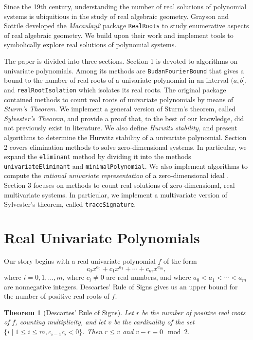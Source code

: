 \documentclass[12pt]{amsart}
\newtheorem{theorem}{Theorem}
\theoremstyle{definition}
\begin{document}
Since the 19th century, understanding the number of real solutions of polynomial systems is ubiquitious in the study of real algebraic geometry. Grayson and Sottile \cite{MR1949550} developed the \textit{Macaulay2} package \texttt{RealRoots} to study enumerative aspects of real algebraic geometry. We build upon their work and implement tools to symbolically explore real solutions of polynomial systems.

The paper is divided into three sections. Section 1 is devoted to algorithms on  univariate polynomials. Among its methods are \texttt{BudanFourierBound} that gives a bound to the number of real roots of a univariate polynomial in an interval $(a,b]$, and \texttt{realRootIsolation} which isolates its real roots. The original package contained methods to count real roots of univariate polynomials by means of \textit{Sturm's Theorem}. We implement a general version of Sturm's theorem, called \textit{Sylvester's Theorem}, and provide a proof that, to the best of our knowledge, did not previously exist in literature. We also define \textit{Hurwitz stability}, and present algorithms to determine the Hurwitz stability of a univariate polynomial. Section 2 covers elimination methods to solve zero-dimensional systems. In particular, we expand the \texttt{eliminant} method by dividing it into the methods \texttt{univariateEliminant} and \texttt{minimalPolynomial}. We also implement algorithms to compute the \textit{rational univariate representation} of a zero-dimensional ideal \cite{cite-key}. Section 3 focuses on methods to count real solutions of zero-dimensional, real multivariate systems. In particular, we implement a multivariate version of Sylvester's theorem, called \texttt{traceSignature}.

\section{Real Univariate Polynomials}

Our story begins with a real univariate polynomial $f$ of the form $$c_{0}x^{a_{0}} + c_{1}x^{a_{1}} + \cdots + c_{m}x^{a_{m}},$$ where $i=0,1,\dots, m$, where $c_{i} \neq 0$ are real numbers, and where $a_{0} < a_{1} < \cdots < a_{m}$ are nonnegative integers. Descartes' Rule of Signs \cite{MR2830310} gives us an upper bound for the number of positive real roots of $f$.

\begin{theorem}[Descartes' Rule of Signs]Let $r$ be the number of positive real roots of $f$, counting multiplicity, and let $v$ be the cardinality of the set $\{i\mid1\leq i\leq m, c_{i-1}c_{i}<0\}$. Then $r\leq v$ and $v-r\equiv 0 \mod 2$. \end{theorem}
\end{document}
